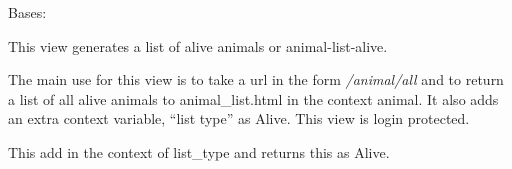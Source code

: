 \documentclass[letterpaper,10pt,english]{sphinxmanual}
\begin{document}

\begin{fulllineitems}
\label{api:mousedb.animal.views.AnimalListAlive}
Bases: {\hyperref[api:mousedb.animal.views.AnimalList]{}}

This view generates a list of alive animals or animal-list-alive.

The main use for this view is to take a url in the form \emph{/animal/all} and to return a list of all alive animals to animal\_list.html in the context animal.  It also adds an extra context variable, ``list type'' as Alive.  
This view is login protected.


\begin{fulllineitems}
\label{api:mousedb.animal.views.AnimalListAlive.get_context_data}
This add in the context of list\_type and returns this as Alive.

\end{fulllineitems}


\end{fulllineitems}


\end{document}
